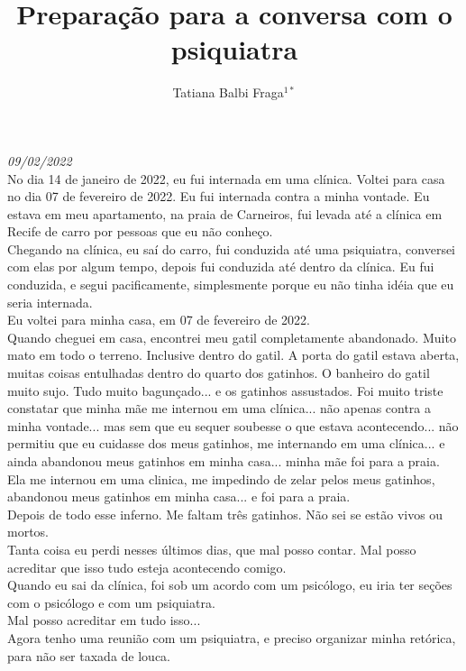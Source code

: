 \documentclass{book}
\title{Preparação para a conversa com o psiquiatra}
\author{Tatiana Balbi Fraga$^{1*}$}
\begin{document}
\emph{09/02/2022}  \\

No dia 14 de janeiro de 2022, eu fui internada em uma clínica. Voltei para casa no dia 07 de fevereiro de 2022. Eu fui internada contra a minha vontade. Eu estava em meu apartamento, na praia de Carneiros, fui levada até a clínica em Recife de carro por pessoas que eu não conheço. \\

Chegando na clínica, eu saí do carro, fui conduzida até uma psiquiatra, conversei com elas por algum tempo, depois fui conduzida até dentro da clínica. Eu fui conduzida, e segui pacificamente, simplesmente porque eu não tinha idéia que eu seria internada. \\

Eu voltei para minha casa, em 07 de fevereiro de 2022. \\

Quando cheguei em casa, encontrei meu gatil completamente abandonado. Muito mato em todo o terreno. Inclusive dentro do gatil. A porta do gatil estava aberta, muitas coisas entulhadas dentro do quarto dos gatinhos. O banheiro do gatil muito sujo. Tudo muito bagunçado... e os gatinhos assustados. Foi muito triste constatar que minha mãe me internou em uma clínica... não apenas contra a minha vontade... mas sem que eu sequer soubesse o que estava acontecendo... não permitiu que eu cuidasse dos meus gatinhos, me internando em uma clínica... e ainda abandonou meus gatinhos em minha casa... minha mãe foi para a praia. \\

Ela me internou em uma clinica, me impedindo de zelar pelos meus gatinhos, abandonou meus gatinhos em minha casa... e foi para a praia.\\

Depois de todo esse inferno. Me faltam três gatinhos. Não sei se estão vivos ou mortos. \\

Tanta coisa eu perdi nesses últimos dias, que mal posso contar. Mal posso acreditar que isso tudo esteja acontecendo comigo. \\

Quando eu sai da clínica, foi sob um acordo com um psicólogo, eu iria ter seções com o psicólogo e com um psiquiatra.\\

Mal posso acreditar em tudo isso... \\

Agora tenho uma reunião com um psiquiatra, e preciso organizar minha retórica, para não ser taxada de louca. \\
\end{document}
